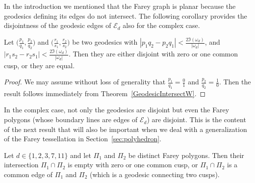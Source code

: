 \documentclass[graybox]{svmult}
\begin{document}
In the introduction we mentioned that the Farey graph is planar because the geodesics defining its edges do not intersect.  The following corollary provides the disjointness of the geodesic edges of $\mathcal{E}_d$ also for the complex case.

\begin{corollary}\label{cor:geocor}
Let $\big(\frac {p_1}{q_1}, \frac {p_2}{q_2}\big)$ and $\big(\frac {r_1}{s_1}, \frac {r_2}{s_2}\big)$ be two geodesics with $|p_1q_2-p_2q_1|< \frac{2\Im(\omega_d)}{|\omega_d|}$, and $|r_1s_2-r_2s_1| < \frac{2\Im(\omega_d)}{|\omega_d|}$. Then they are either disjoint with zero or one common cusp, or they are equal.
\end{corollary}

\begin{proof}
We may assume without loss of generality that $\frac{p_1}{q_1}=\frac01$ and $\frac{p_2}{q_2} = \frac 10$. Then the result follows immediately from Theorem~\ref{GeodesicIntersectW}.
\end{proof}

In the complex case, not only the geodesics are disjoint but even the Farey polygons (whose boundary lines are edges of $\mathcal{E}_d$) are disjoint. This is the content of the next result that will also be important when we deal with a generalization of the Farey tessellation in Section~\ref{sec:polyhedron}.

\begin{proposition}\label{lem:GeodesicIntersectGeneral}
Let $d\in\{1,2,3,7,11\}$ and let $\Pi_1$ and $\Pi_2$ be distinct Farey polygons. Then their intersection $\Pi_1\cap \Pi_2$ is empty with zero or one common cusp, or $\Pi_1\cap \Pi_2$ is a common edge of $\Pi_1$ and $\Pi_2$ (which is a geodesic connecting two cusps).
\end{proposition}
\end{document}
